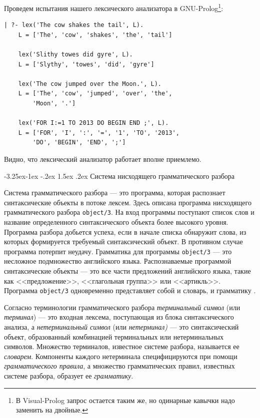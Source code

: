 \documentclass[12pt, openany, twoside]{book} %
\makeatletter
\renewcommand\subsection{\@startsection{subsection}{2}{\z@}%
                                     {-3.25ex\@plus -1ex \@minus -.2ex}%
                                     {1.5ex \@plus .2ex}%
                                     {\normalfont\normalsize\bfseries}}
\makeatother
\begin{document}
Проведем испытания нашего лексического анализатора в GNU-Prolog\footnote{В Visual-Prolog запрос остается таким же, но одинарные кавычки надо заменить на двойные.}:
{\tt\begin{verbatim}
| ?- lex('The cow shakes the tail', L).
    L = ['The', 'cow', 'shakes', 'the', 'tail']

    lex('Slithy towes did gyre', L).
    L = ['Slythy', 'towes', 'did', 'gyre']

    lex('The cow jumped over the Moon.', L).
    L = ['The', 'cow', 'jumped', 'over', 'the',
        'Moon', '.']

    lex('FOR I:=1 TO 2013 DO BEGIN END ;', L).
    L = ['FOR', 'I', ':', '=', '1', 'TO', '2013',
        'DO', 'BEGIN', 'END', ';']
\end{verbatim}}
\noindent Видно, что лексический анализатор работает вполне приемлемо.

\subsection{Система нисходящего грамматического разбора}

Система грамматического разбора --- это программа, которая распознает синтаксические объекты в потоке лексем. Здесь описана программа нисходящего грамматического разбора {\tt object/3}. На вход программы поступают список слов и название определенного синтаксического объекта более высокого уровня. Программа разбора добьется успеха, если в начале списка обнаружит слова, из которых формируется требуемый синтаксический объект. В противном случае программа потерпит неудачу. Грамматика для программы {\tt object/3} --- это несложное подмножество английского языка. Распознаваемые программой синтаксические объекты --- это все части предложений английского языка, такие как <<предложение>>, <<глагольная группа>> или <<артикль>>. Программа {\tt object/3} одновременно представляет собой и словарь, и грамматику \cite{Malpas}.

Согласно терминологии грамматического разбора \emph{терминальный символ} (или \emph{терминал}) --- это входная лексема, поступающая из блока синтаксического анализа, а \emph{нетерминальный символ} (или \emph{нетерминал)} --- это синтаксический объект, образованный комбинацией терминальных или нетерминальных символов. Множество терминалов, известное системе разбора, называется ее \emph{словарем}. Компоненты каждого нетерминала специфицируются при помощи \emph{грамматического правила}, а множество грамматических правил, известных системе разбора, образует ее \emph{грамматику}.
\end{document}
